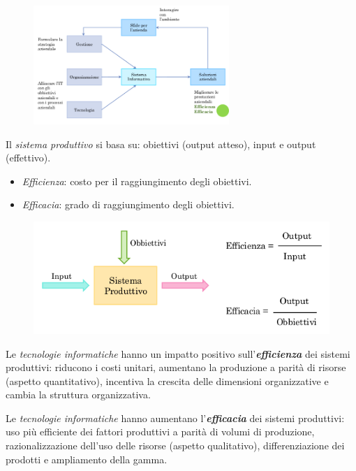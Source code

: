 \documentclass[a4paper, notitlepage, 9pt]{extreport}
\begin{document}
\begin{multicols}{2}
	\begin{figure}[H]
		\centering
		\includegraphics[height=4.5cm]{SistemaInformativoAziendale}
	\end{figure}
	\columnbreak
	\noindent
	Il \textit{sistema produttivo} si basa su: obiettivi (output atteso), input e output (effettivo).

	\begin{itemize}
		\item \textit{Efficienza}: costo per il raggiungimento degli obiettivi.
		\item \textit{Efficacia}: grado di raggiungimento degli obiettivi.
	\end{itemize}
	\begin{figure}[H]
		\centering
		\includegraphics[scale=0.32]{EfficienzaEfficacia}
	\end{figure}
\end{multicols}

Le \textit{tecnologie informatiche} hanno un impatto positivo sull'\textit{\textbf{efficienza}} dei sistemi produttivi: riducono i costi unitari, aumentano la produzione a parità di risorse (aspetto quantitativo), incentiva la crescita delle dimensioni organizzative e cambia la struttura organizzativa.
\newline

Le \textit{tecnologie informatiche} hanno aumentano l'\textit{\textbf{efficacia}} dei sistemi produttivi: uso più efficiente dei fattori produttivi a parità di volumi di produzione, razionalizzazione dell'uso delle risorse (aspetto qualitativo), differenziazione dei prodotti e ampliamento della gamma.
\newline
\end{document}
